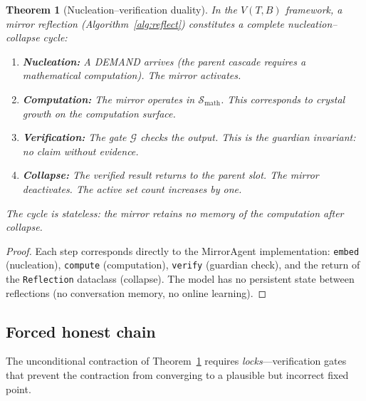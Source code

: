 \documentclass[11pt,a4paper]{article}
\newtheorem{theorem}{Theorem}[section]
\newcommand{\cG}{\mathcal{G}}
\newcommand{\cS}{\mathcal{S}}
\begin{document}
\begin{theorem}[Nucleation--verification duality]\label{thm:nucleation}
In the $V(T,B)$ framework, a mirror reflection
(Algorithm~\ref{alg:reflect}) constitutes a complete
nucleation--collapse cycle:
\begin{enumerate}[label=(\roman*),nosep]
\item \textbf{Nucleation:} A DEMAND arrives (the parent cascade
  requires a mathematical computation).
  The mirror activates.
\item \textbf{Computation:} The mirror operates in $\cS_{\text{math}}$.
  This corresponds to crystal growth on the computation surface.
\item \textbf{Verification:} The gate $\cG$ checks the output.
  This is the guardian invariant: no claim without evidence.
\item \textbf{Collapse:} The verified result returns to the
  parent slot.
  The mirror deactivates.
  The active set count increases by one.
\end{enumerate}
The cycle is stateless: the mirror retains no memory of the
computation after collapse.
\end{theorem}

\begin{proof}
Each step corresponds directly to the MirrorAgent implementation:
\texttt{embed} (nucleation), \texttt{compute} (computation),
\texttt{verify} (guardian check), and the return of the
\texttt{Reflection} dataclass (collapse).
The model has no persistent state between reflections
(no conversation memory, no online learning).
\end{proof}

\subsection{Forced honest chain}\label{sec:devil}

The unconditional contraction of Theorem~\ref{thm:nucleation}
requires \emph{locks}---verification gates that prevent the
contraction from converging to a plausible but incorrect fixed point.
\end{document}
